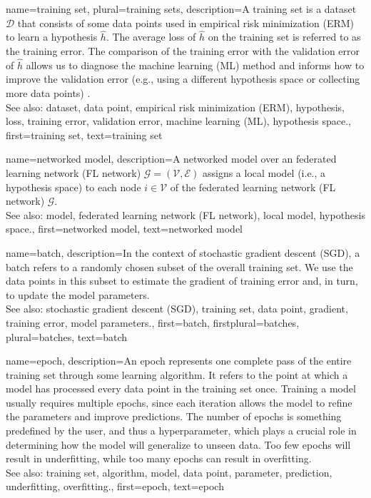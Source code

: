 {
{name={training set}, plural={training sets},
	description={A training set is a dataset $\mathcal{D}$ that consists of some data points used in empirical risk minimization (ERM) 
		to learn a hypothesis $\hat{h}$. The average loss of $\hat{h}$ on the 
		training set is referred to as the training error. The comparison of the training error with the 
		validation error of $\hat{h}$ allows us to diagnose the machine learning (ML) method and informs how to improve 
		the validation error (e.g., using a different hypothesis space or collecting more data points) \cite[Sec. 6.6]{MLBasics}.
			\\
		See also: dataset, data point, empirical risk minimization (ERM), hypothesis, loss, training error, validation error, machine learning (ML), hypothesis space.},
	first={training set},
	text={training set}  
}

{name={networked model},
 	description={A networked model over an federated learning network (FL network) $\mathcal{G} = \left( \mathcal{V},\mathcal{E} \right)$ assigns 
   		a local model (i.e., a hypothesis space) to each node $i \in \mathcal{V}$ of the federated learning network (FL network) $\mathcal{G}$.
   		\\
		See also: model, federated learning network (FL network), local model, hypothesis space.}, 
   first={networked model},
   text={networked model}  
}

{name={batch},
	description={In the context of stochastic gradient descent (SGD), a batch refers to a randomly 
		chosen subset of the overall training set. We use the data points in this subset 
		to estimate the gradient of training error and, in turn, to update the model parameters.
			\\
		See also: stochastic gradient descent (SGD), training set, data point, gradient, training error, model parameters.}, 
 	first={batch},
 	firstplural={batches}, 
 	plural={batches}, 
 	text={batch}  
}


{name={epoch},
	description={An epoch represents one complete pass of the entire training set through some learning 
		algorithm. It refers to the point at which a model has processed every data point in the training set once. 
		Training a model usually requires multiple epochs, since each iteration allows the model to refine the 
		parameters and improve predictions. The number of epochs is something predefined by the user,  
		and thus a hyperparameter, which plays a crucial role in determining how the model will generalize to unseen data. 
		Too few epochs will result in underfitting, while too many epochs can result in overfitting.
		\\
		See also: training set, algorithm, model, data point, parameter, prediction, underfitting, overfitting.},
	first={epoch},
	text={epoch}
} 


}
